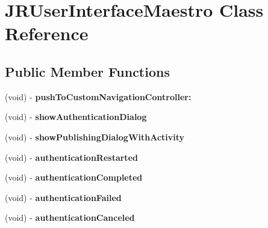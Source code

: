 \hypertarget{interface_j_r_user_interface_maestro}{
\section{JRUserInterfaceMaestro Class Reference}
\label{interface_j_r_user_interface_maestro}
}
\subsection*{Public Member Functions}
\begin{DoxyCompactItemize}
\item 
\hypertarget{interface_j_r_user_interface_maestro_af43273fafeab5e20a9ff21e49a1585ae}{
(void) -\/ {\bfseries pushToCustomNavigationController:}}
\label{interface_j_r_user_interface_maestro_af43273fafeab5e20a9ff21e49a1585ae}

\item 
\hypertarget{interface_j_r_user_interface_maestro_a7cc765f051d7e6534989537e4860a2b7}{
(void) -\/ {\bfseries showAuthenticationDialog}}
\label{interface_j_r_user_interface_maestro_a7cc765f051d7e6534989537e4860a2b7}

\item 
\hypertarget{interface_j_r_user_interface_maestro_a5e1c4be830f9d9d76d1ba85cd3506db2}{
(void) -\/ {\bfseries showPublishingDialogWithActivity}}
\label{interface_j_r_user_interface_maestro_a5e1c4be830f9d9d76d1ba85cd3506db2}

\item 
\hypertarget{interface_j_r_user_interface_maestro_a261ffc76b261d780aca280790a25a665}{
(void) -\/ {\bfseries authenticationRestarted}}
\label{interface_j_r_user_interface_maestro_a261ffc76b261d780aca280790a25a665}

\item 
\hypertarget{interface_j_r_user_interface_maestro_a95527d6722e43df36051e15693da7789}{
(void) -\/ {\bfseries authenticationCompleted}}
\label{interface_j_r_user_interface_maestro_a95527d6722e43df36051e15693da7789}

\item 
\hypertarget{interface_j_r_user_interface_maestro_a8ffdc47240932fa30ce506c0e2f128ca}{
(void) -\/ {\bfseries authenticationFailed}}
\label{interface_j_r_user_interface_maestro_a8ffdc47240932fa30ce506c0e2f128ca}

\item 
\hypertarget{interface_j_r_user_interface_maestro_afb0bde185376328c8570956b71cde065}{
(void) -\/ {\bfseries authenticationCanceled}}
\label{interface_j_r_user_interface_maestro_afb0bde185376328c8570956b71cde065}


\end{DoxyCompactItemize}
